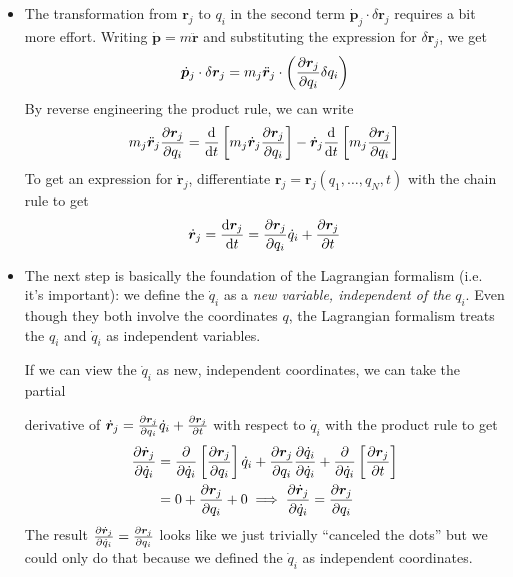 \documentclass[11pt, a4paper]{article}
\newcommand{\bdot}[1]{\dot{\bm{#1}}}
\newcommand{\bddot}[1]{\ddot{\bm{#1}}}
\begin{document}
\begin{itemize}
	\item The transformation from $ \bm{r}_{j} $ to $ q_{i} $ in the second term $ \bdot{p}_{j} \cdot \delta \bm{r}_{j} $ requires a bit more effort. Writing $ \bdot{p} = m \bddot{r} $ and substituting the expression for $ \delta \bm{r}_{j} $, we get
	\begin{equation*}
		\bdot{p}_{j} \cdot \delta \bm{r}_{j} = m_{j}  \bddot{r}_{j} \cdot \left(\pdv{\bm{r}_{j}}{q_{i}} \delta q_{i}\right)
	\end{equation*}
	By reverse engineering the product rule, we can write
	\begin{equation*}
		m_{j}\bddot{\bm{r}}_{j} \pdv{\bm{r}_{j}}{q_{i}} = \dv{}{t}\left[m_{j}\bdot{r}_{j}  \pdv{\bm{r}_{j}}{q_{i}} \right] - \bdot{r}_{j} \dv{}{t}\left[m_{j}\pdv{\bm{r}_{j}}{q_{i}} \right]
	\end{equation*}
	To get an expression for $ \bdot{r}_{j} $, differentiate $ \bm{r}_{j} = \bm{r}_{j}(q_{1}, \ldots, q_{N}, t)$ with the chain rule to get
	\begin{equation*}
		\bdot{r}_{j} = \dv{\bm{r}_{j}}{t} = \pdv{\bm{r}_{j}}{q_{i}} \dot{q}_{i} + \pdv{\bm{r}_{j}}{t}
	\end{equation*}
	
	\item The next step is basically the foundation of the Lagrangian formalism (i.e. it's important): we define the $ \dot{q}_{i} $ as a \textit{new variable, independent of the} $ q_{i} $. Even though they both involve the coordinates $ q $, the Lagrangian formalism treats the $ q_{i} $ and $ \dot{q}_{i} $ as independent variables.
	
	If we can view the $ \dot{q}_{i} $ as new, independent coordinates, we can take the partial 

	derivative of  $ \bdot{r}_{j} = \pdv{\bm{r}_{j}}{q_{i}} \dot{q}_{i} + \pdv{\bm{r}_{j}}{t} $ with respect to $ \dot{q}_{i} $ with the product rule to get
	\begin{align*}
		\pdv{\bdot{r}_{j}}{\dot{q}_{i}} &= \pdv{}{\dot{q}_{i}} \left[\pdv{\bm{r}_{j}}{q_{i}}\right] \dot{q}_{i} + \pdv{\bm{r}_{j}}{q_{i}} \pdv{\dot{q}_{i}}{\dot{q}_{i}} + \pdv{}{\dot{q}_{i}} \left[ \pdv{\bm{r}_{j}}{t}\right] \\
		&= 0 +  \pdv{\bm{r}_{j}}{q_{i}} + 0 \implies \pdv{\bdot{r}_{j}}{\dot{q}_{i}} = \pdv{\bm{r}_{j}}{q_{i}}
	\end{align*}
	The result $ \pdv{\bdot{r}_{j}}{\dot{q}_{i}} = \pdv{\bm{r}_{j}}{q_{i}} $ looks like we just trivially ``canceled the dots'' but we could only do that because we defined the $ \dot{q}_{i} $  as independent coordinates.
	

\end{itemize}
\end{document}
